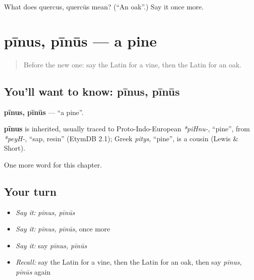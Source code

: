 \begin{tcolorbox}[breakable,colback=teal!4,colframe=teal!35!black,title={Before you move on}]
What does quercus, quercūs mean? (\textquotedblleft{}An oak\textquotedblright{}.) Say it once more.
\end{tcolorbox}
\section[pīnus, pīnūs]{pīnus, pīnūs — a pine}

\label{lesson:LA-C250-pinus}



\begin{quote}
Before the new one: say the Latin for a vine, then the Latin for an oak.
\end{quote}

\subsection*{You'll want to know: pīnus, pīnūs}
\textbf{pīnus, pīnūs} — \textquotedblleft{}a pine\textquotedblright{}.

\begin{cousinweb}
\textbf{pīnus} is inherited, usually traced to Proto-Indo-European \emph{*piHnu-}, \textquotedblleft{}pine\textquotedblright{}, from \emph{*peyH-}, \textquotedblleft{}sap, resin\textquotedblright{} (EtymDB 2.1); Greek \emph{pitys}, \textquotedblleft{}pine\textquotedblright{}, is a cousin (Lewis \& Short).
\end{cousinweb}

\begin{grammarlens}[title={What you've built}]
One more word for this chapter.
\end{grammarlens}

\subsection*{Your turn}
\begin{itemize}
\raggedright
  \item \emph{Say it:} \emph{pīnus, pīnūs}
  \item \emph{Say it:} \emph{pīnus, pīnūs}, once more
  \item \emph{Say it:} say \emph{pīnus, pīnūs}
  \item \emph{Recall:} say the Latin for a vine, then the Latin for an oak, then say \emph{pīnus, pīnūs} again
\end{itemize}

